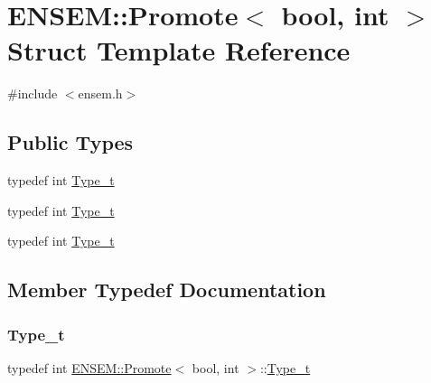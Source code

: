 \hypertarget{structENSEM_1_1Promote_3_01bool_00_01int_01_4}{}\section{E\+N\+S\+EM\+:\+:Promote$<$ bool, int $>$ Struct Template Reference}
\label{structENSEM_1_1Promote_3_01bool_00_01int_01_4}


{\ttfamily \#include $<$ensem.\+h$>$}

\subsection*{Public Types}
\begin{DoxyCompactItemize}
\item 
typedef int \mbox{\hyperlink{structENSEM_1_1Promote_3_01bool_00_01int_01_4_a99e4da6ec7e0f07a99dc32a1da962371}{Type\+\_\+t}}
\item 
typedef int \mbox{\hyperlink{structENSEM_1_1Promote_3_01bool_00_01int_01_4_a99e4da6ec7e0f07a99dc32a1da962371}{Type\+\_\+t}}
\item 
typedef int \mbox{\hyperlink{structENSEM_1_1Promote_3_01bool_00_01int_01_4_a99e4da6ec7e0f07a99dc32a1da962371}{Type\+\_\+t}}
\end{DoxyCompactItemize}


\subsection{Member Typedef Documentation}
\mbox{\label{structENSEM_1_1Promote_3_01bool_00_01int_01_4_a99e4da6ec7e0f07a99dc32a1da962371}} 
\subsubsection{\texorpdfstring{Type\_t}{Type\_t}\hspace{0.1cm}{\footnotesize\ttfamily [1/3]}}
{\footnotesize\ttfamily typedef int \mbox{\hyperlink{structENSEM_1_1Promote}{E\+N\+S\+E\+M\+::\+Promote}}$<$ bool, int $>$\+::\mbox{\hyperlink{structENSEM_1_1Promote_3_01bool_00_01int_01_4_a99e4da6ec7e0f07a99dc32a1da962371}{Type\+\_\+t}}}

\mbox{\label{structENSEM_1_1Promote_3_01bool_00_01int_01_4_a99e4da6ec7e0f07a99dc32a1da962371}} 
